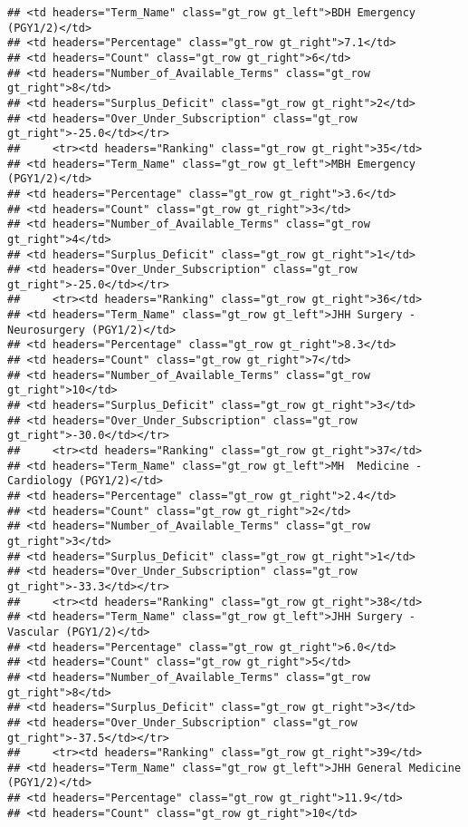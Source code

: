 \documentclass[
]{article}
\begin{document}
\begin{verbatim}
## <td headers="Term_Name" class="gt_row gt_left">BDH Emergency (PGY1/2)</td>
## <td headers="Percentage" class="gt_row gt_right">7.1</td>
## <td headers="Count" class="gt_row gt_right">6</td>
## <td headers="Number_of_Available_Terms" class="gt_row gt_right">8</td>
## <td headers="Surplus_Deficit" class="gt_row gt_right">2</td>
## <td headers="Over_Under_Subscription" class="gt_row gt_right">-25.0</td></tr>
##     <tr><td headers="Ranking" class="gt_row gt_right">35</td>
## <td headers="Term_Name" class="gt_row gt_left">MBH Emergency (PGY1/2)</td>
## <td headers="Percentage" class="gt_row gt_right">3.6</td>
## <td headers="Count" class="gt_row gt_right">3</td>
## <td headers="Number_of_Available_Terms" class="gt_row gt_right">4</td>
## <td headers="Surplus_Deficit" class="gt_row gt_right">1</td>
## <td headers="Over_Under_Subscription" class="gt_row gt_right">-25.0</td></tr>
##     <tr><td headers="Ranking" class="gt_row gt_right">36</td>
## <td headers="Term_Name" class="gt_row gt_left">JHH Surgery - Neurosurgery (PGY1/2)</td>
## <td headers="Percentage" class="gt_row gt_right">8.3</td>
## <td headers="Count" class="gt_row gt_right">7</td>
## <td headers="Number_of_Available_Terms" class="gt_row gt_right">10</td>
## <td headers="Surplus_Deficit" class="gt_row gt_right">3</td>
## <td headers="Over_Under_Subscription" class="gt_row gt_right">-30.0</td></tr>
##     <tr><td headers="Ranking" class="gt_row gt_right">37</td>
## <td headers="Term_Name" class="gt_row gt_left">MH  Medicine - Cardiology (PGY1/2)</td>
## <td headers="Percentage" class="gt_row gt_right">2.4</td>
## <td headers="Count" class="gt_row gt_right">2</td>
## <td headers="Number_of_Available_Terms" class="gt_row gt_right">3</td>
## <td headers="Surplus_Deficit" class="gt_row gt_right">1</td>
## <td headers="Over_Under_Subscription" class="gt_row gt_right">-33.3</td></tr>
##     <tr><td headers="Ranking" class="gt_row gt_right">38</td>
## <td headers="Term_Name" class="gt_row gt_left">JHH Surgery - Vascular (PGY1/2)</td>
## <td headers="Percentage" class="gt_row gt_right">6.0</td>
## <td headers="Count" class="gt_row gt_right">5</td>
## <td headers="Number_of_Available_Terms" class="gt_row gt_right">8</td>
## <td headers="Surplus_Deficit" class="gt_row gt_right">3</td>
## <td headers="Over_Under_Subscription" class="gt_row gt_right">-37.5</td></tr>
##     <tr><td headers="Ranking" class="gt_row gt_right">39</td>
## <td headers="Term_Name" class="gt_row gt_left">JHH General Medicine (PGY1/2)</td>
## <td headers="Percentage" class="gt_row gt_right">11.9</td>
## <td headers="Count" class="gt_row gt_right">10</td>

\end{verbatim}
\end{document}
